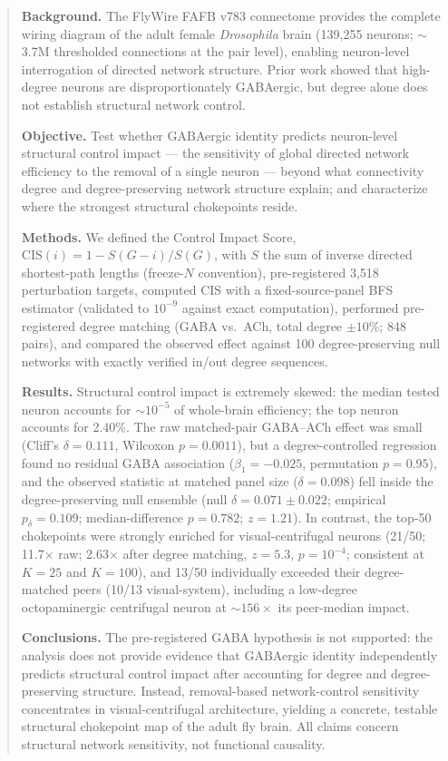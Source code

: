 \begin{abstract}
\noindent\textbf{Background.} The FlyWire FAFB v783 connectome provides the
complete wiring diagram of the adult female \emph{Drosophila} brain
(139,255 neurons; $\sim$3.7M thresholded connections at the pair level),
enabling neuron-level interrogation of directed network structure. Prior
work showed that high-degree neurons are disproportionately GABAergic,
but degree alone does not establish structural network control.

\noindent\textbf{Objective.} Test whether GABAergic identity predicts
neuron-level structural control impact --- the sensitivity of global
directed network efficiency to the removal of a single neuron --- beyond
what connectivity degree and degree-preserving network structure explain;
and characterize where the strongest structural chokepoints reside.

\noindent\textbf{Methods.} We defined the Control Impact Score,
$\mathrm{CIS}(i)=1-S(G-i)/S(G)$, with $S$ the sum of inverse directed
shortest-path lengths (freeze-$N$ convention), pre-registered 3,518
perturbation targets, computed CIS with a fixed-source-panel BFS estimator
(validated to $10^{-9}$ against exact computation), performed
pre-registered degree matching (GABA vs.\ ACh, total degree $\pm10\%$;
848 pairs), and compared the observed effect against 100 degree-preserving
null networks with exactly verified in/out degree sequences.

\noindent\textbf{Results.} Structural control impact is extremely skewed:
the median tested neuron accounts for $\sim$$10^{-5}$ of whole-brain
efficiency; the top neuron accounts for 2.40\%. The raw matched-pair
GABA--ACh effect was small (Cliff's $\delta=0.111$, Wilcoxon $p=0.0011$),
but a degree-controlled regression found no residual GABA association
($\beta_1=-0.025$, permutation $p=0.95$), and the observed statistic at
matched panel size ($\delta=0.098$) fell inside the degree-preserving null
ensemble (null $\delta=0.071\pm0.022$; empirical $p_\delta=0.109$;
median-difference $p=0.782$; $z=1.21$). In contrast, the top-50
chokepoints were strongly enriched for visual-centrifugal neurons
(21/50; 11.7$\times$ raw; 2.63$\times$ after degree matching, $z=5.3$,
$p=10^{-4}$; consistent at $K=25$ and $K=100$), and 13/50 individually
exceeded their degree-matched peers (10/13 visual-system), including a
low-degree octopaminergic centrifugal neuron at ${\sim}156\times$ its
peer-median impact.

\noindent\textbf{Conclusions.} The pre-registered GABA hypothesis is not
supported: the analysis does not provide evidence that GABAergic identity
independently predicts structural control impact after accounting for
degree and degree-preserving structure. Instead, removal-based
network-control sensitivity concentrates in visual-centrifugal
architecture, yielding a concrete, testable structural chokepoint map of
the adult fly brain. All claims concern structural network sensitivity,
not functional causality.
\end{abstract}
